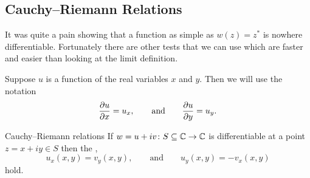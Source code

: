 \documentclass{article}
\begin{document}
    \subsection{Cauchy--Riemann Relations}
    It was quite a pain showing that a function as simple as \(w(z) = z^*\) is nowhere differentiable.
    Fortunately there are other tests that we can use which are faster and easier than looking at the limit definition.
    \begin{notation*}{}
        Suppose \(u\) is a function of the real variables \(x\) and \(y\).
        Then we will use the notation
        \[\pdv{u}{x} = u_x, \qquad\text{and}\qquad \pdv{u}{y} = u_y.\]
    \end{notation*}
    \begin{theorem}{Cauchy--Riemann relations}{}
        If \(w = u + iv\colon S\subseteq \mathbb{C}\to\mathbb{C}\) is differentiable at a point \(z = x + iy\in S\) then the ,
        \[u_x(x, y) = v_y(x, y), \qquad\text{and}\qquad u_y(x, y) = -v_x(x, y)\]
        hold.
    \end{theorem}
\end{document}

